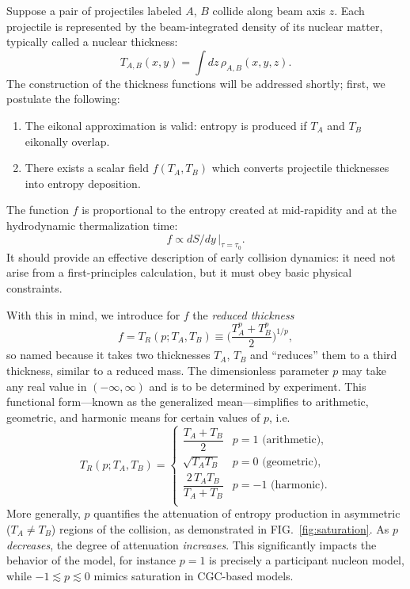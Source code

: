 \documentclass[aps,prc,reprint,amsmath,nofootinbib]{revtex4-1}
\begin{document}
Suppose a pair of projectiles labeled $A$, $B$ collide along beam axis $z$.  Each projectile is represented by
the beam-integrated density of its nuclear matter, typically called a nuclear thickness:
\begin{equation}
  T_{A,B}(x, y) = \int dz \, \rho_{A,B}(x, y, z).
\end{equation}
The construction of the thickness functions will be addressed shortly; first, we postulate the following:
\begin{enumerate}
  \item The eikonal approximation is valid:  entropy is produced if $T_A$ and $T_B$ eikonally overlap.
  \item There exists a scalar field $f(T_A, T_B)$ which converts projectile thicknesses into entropy
    deposition.
\end{enumerate}
The function $f$ is proportional to the entropy created at mid-rapidity and at the hydrodynamic thermalization
time:
\begin{equation}
  f \propto dS/dy \, |_{\tau = \tau_0}.
\end{equation}
It should provide an effective description of early collision dynamics:  it need not arise from a
first-principles calculation, but it must obey basic physical constraints.

With this in mind, we introduce for $f$ the \emph{reduced thickness}
\begin{equation}
  f = T_R(p; T_A, T_B) \equiv \biggl( \frac{T_A^p + T_B^p}{2} \biggr)^{1/p},
  \label{eq:tr}
\end{equation}
so named because it takes two thicknesses $T_A$, $T_B$ and ``reduces'' them to a third thickness, similar to a
reduced mass.  The dimensionless parameter $p$ may take any real value in $(-\infty, \infty)$ and is to be
determined by experiment.  This functional form---known as the generalized mean---simplifies to arithmetic,
geometric, and harmonic means for certain values of $p$, i.e.
\begin{equation}
  T_R(p; T_A, T_B) =
  \begin{cases}
    \dfrac{T_A + T_B}{2} & p = 1 \text{ (arithmetic)}, \\[2ex]
    \sqrt{T_A T_B} & p = 0 \text{ (geometric)}, \\[2ex]
    \dfrac{2\, T_A T_B}{T_A + T_B} & p = -1 \text{ (harmonic)}. \\
  \end{cases}
\end{equation}
More generally, $p$ quantifies the attenuation of entropy production in asymmetric ($T_A \neq T_B$) regions of
the collision, as demonstrated in FIG.~\ref{fig:saturation}.  As $p$ \emph{decreases}, the degree of
attenuation \emph{increases}.  This significantly impacts the behavior of the model, for instance $p=1$ is
precisely a participant nucleon model, while $-1 \lesssim p \lesssim 0$ mimics saturation in CGC-based models.
\end{document}
